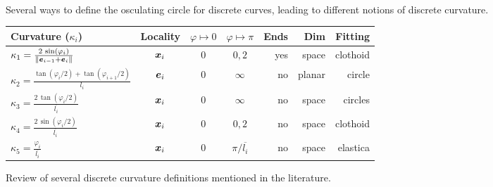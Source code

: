 \begin{figure}[p]
\centering
\renewcommand{\arraystretch}{1.5}
		\vspace{-0.5cm}
		\hspace{5mm}
    		 \\[-10pt]
		\hspace{5mm}
		\vspace{10pt}
		\caption{Several ways to define the osculating circle for discrete curves, leading to different notions of discrete curvature.}
		\label{fig:kb_def}
		\vspace{0.75cm}
 		\begin{tabularx}{0.9\textwidth}{@{} X c c c r r r @{}}
      		\toprule
		Curvature ($\kappa_i$) 										&  Locality 	&  $\varphi \mapsto 0$ 	&  $\varphi \mapsto \pi$ 		& Ends  	& Dim 	&  Fitting			\\
		\midrule
		$\kappa_1 = \frac{2\, \sin(\varphi_i)}{\lVert\boldsymbol{e}_{i-1}+\boldsymbol{e}_i\rVert}$ 	&  $\boldsymbol{x}_i$ 	&  $0$				&  $0, 2$					&  yes	&  space	&  clothoid			\\
		$\kappa_2 = \frac{\tan(\varphi_i/2)+\tan(\varphi_{i+1}/2)}{l_i}$ 			&  $\boldsymbol{e}_i$ 	&  $0$				&  $\infty$					&  no		&  planar	&  circle			\\
 		$\kappa_3 = \frac{2\, \tan(\varphi_i / 2)}{\overbar{l_i}} $				&  $\boldsymbol{x}_i$	&  $0$ 				&  $\infty$					&  no		&  space	&  circles			\\
		\midrule
		$\kappa_4 = \frac{2\,\sin(\varphi_i / 2)}{\overbar{l_i}}$ 				&  $\boldsymbol{x}_i$	&  $0$				&  $0, 2$					&  no		&  space	&  clothoid  		\\
		$\kappa_5 = \frac{\varphi_i}{\overbar{l_i}}$ 						&  $\boldsymbol{x}_i$	&  $0$				&  $\pi/\overbar{l_i}$			&  no		&  space	&  elastica  		\\
		\bottomrule
		\end{tabularx}
		\vspace{10pt}
		\caption{Review of several discrete curvature definitions mentioned in the literature.}
		\label{tab:kb_def}
\end{figure}

